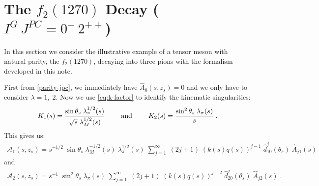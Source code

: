 \section{The \(f_2(1270)\)  Decay (\(I^G \,J^{PC} = 0^- \, 2^{++}\))} \label{app:2pp}
In this section we consider the illustrative example of a tensor meson with natural parity, the \(f_2(1270)\), decaying into three pions with the formalism developed in this note.

First from \cref{parity-jpc}, we immediately have \(\hat{A}_0(s,z_s) = 0\) and we only have to consider \(\lambda = 1, \; 2\). Now we use \cref{eq:k-factor} to identify the kinematic singularities:
  \begin{align}
  K_1(s) =  \frac{\sin\theta_s \;\lambda^{1/2}_\pi(s)}{ \sqrt{s} \; \lambda^{1/2}_M(s) }
  \qquad \text{ and } \qquad
  K_2(s) = \frac{\sin^2\theta_s \;\lambda_\pi(s)}{s} \; .
  \end{align}
This gives us:
  \begin{align}
    \label{eq:2pp-1}
    \mathcal{A}_1(s,z_s) = s^{-1/2} \; \sin\theta_s \; \lambda^{-1/2}_M(s)  \;\lambda^{1/2}_\pi(s)\; \sum_{j = 1}^\infty \; (2j+1) \; (k(s)q(s))^{j-1} \; \hat{d}_{10}^j(\theta_s) \; \hat{A}_{j1}(s)
  \end{align}
and
  \begin{align}
    \label{eq:2pp-2}
    \mathcal{A}_2(s,z_s) = s^{-1} \; \sin^2\theta_s \; \lambda_\pi(s) \; \sum_{j=1}^\infty \; (2j+1) \; (k(s)q(s))^{j-2} \; \hat{d}_{20}^j(\theta_s) \; \hat{A}_{j2}(s) \; .
  \end{align}
